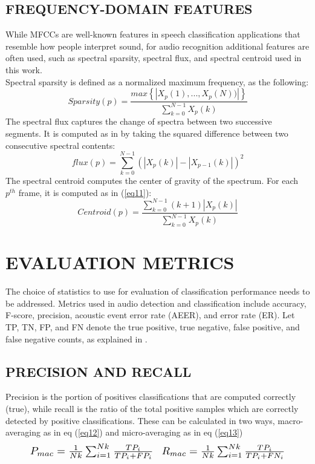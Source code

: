\documentclass{ieeeaccess}
\begin{document}
\subsection{FREQUENCY-DOMAIN FEATURES}
While MFCCs are well-known features in speech classification applications that resemble how people interpret sound, for audio recognition additional features are often used, such as spectral sparsity, spectral flux, and spectral centroid used in this work.\\
Spectral sparsity is defined as a normalized maximum frequency, as the following:
\begin{equation}
Sparsity(p)=\frac{max\left \{ \left | X_{p}(1),...,X_{p}(N)) \right | \right \}}{\sum_{k=0}^{N-1}X_{p}(k)}
\label{eq9}
\end{equation}
The spectral flux captures the change of spectra between two successive segments. It is computed as in \cite{22} by taking the squared difference between two consecutive spectral contents:  
\begin{equation}
flux(p)=\sum_{k=0}^{N-1}(\left | X_{p}(k) \right |-\left | X_{p-1}(k) \right |)^{2}
\label{eq10}
\end{equation}
The spectral centroid computes the center of gravity of the spectrum. For each $p^{th}$ frame, it is computed as in (\ref{eq11}):
\begin{equation}
Centroid(p)=\frac{\sum_{k=0}^{N-1}(k+1)\left | X_{p}(k) \right |}{\sum_{k=0}^{N-1} X_{p}(k) }
\label{eq11}
\end{equation}




\section{EVALUATION METRICS} \label{sec:V}
The choice of statistics to use for evaluation of classification performance needs to be addressed. Metrics used in audio detection and classification include accuracy, F-score, precision, acoustic event error rate (AEER), and error rate (ER). Let TP, TN, FP, and FN denote the true positive, true negative, false positive, and false negative counts, as explained in \cite{29}. 

\subsection{PRECISION AND RECALL}
Precision is the portion of positives classifications that are computed correctly (true), while recall is the ratio of the total positive samples which are correctly detected by positive classifications. These can be calculated in two ways, macro-averaging as in eq (\ref{eq12}) and micro-averaging as in eq (\ref{eq13})
\begin{equation}
\begin{matrix}
\resizebox{0.422\hsize}{!}{$P_{mac}=\frac{1}{Nk}\sum_{i=1}^{Nk}\frac{TP_{i}}{TP_{i}+FP_{i}} $}
&
\resizebox{0.422\hsize}{!}{$ R_{mac}=\frac{1}{Nk}\sum_{i=1}^{Nk}\frac{TP_{i}}{TP_{i}+FN_{i}} $}
\end{matrix}
\label{eq12}
\end{equation}
\end{document}
